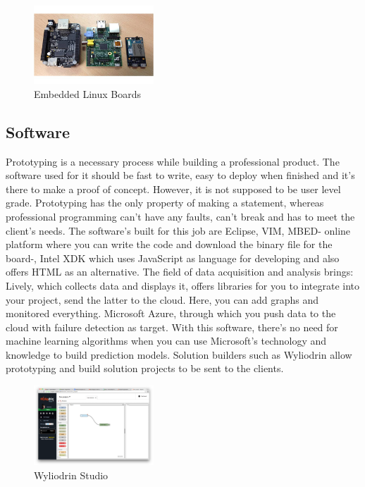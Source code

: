 \begin{figure}[ht]
    \centering
    \includegraphics[width=0.4\textwidth]{figures/Embedded Linux Boards.jpg}
    \caption{Embedded Linux Boards}
\end{figure}

\subsection{Software}
 Prototyping is a necessary process while building a professional product. The software used for it should be fast to write, easy to deploy when finished and it’s there to make a proof of concept. However, it is not supposed to be user level grade.  
Prototyping has the only property of making a statement, whereas professional programming can’t have any faults, can’t break and has to meet the client’s needs. The software’s built for this job are Eclipse, VIM, MBED- online platform where you can write the code and download the binary file for the board-, Intel XDK which uses JavaScript as language for developing and also offers HTML as an alternative.
 The field of data acquisition and analysis brings: 
 Lively, which collects data and displays it, offers libraries for you to integrate into your project, send the latter to the cloud. Here, you can add graphs and monitored everything.
 Microsoft Azure, through which you push data to the cloud with failure detection as target. With this software, there’s no need for machine learning algorithms when you can use Microsoft’s technology and knowledge to build prediction models.  
Solution builders such as Wyliodrin allow prototyping and build solution projects to be sent to the clients.

\begin{figure}[ht]
    \centering
    \includegraphics[width=0.4\textwidth]{figures/Wyliodrin Studio.png}
    \caption{Wyliodrin Studio}
\end{figure}

